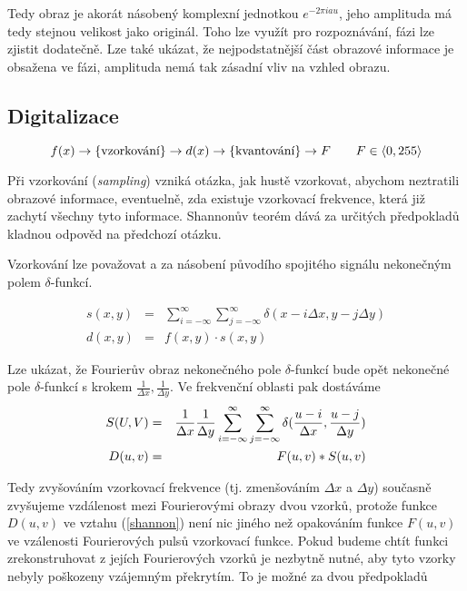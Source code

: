 Tedy obraz je akorát násobený komplexní jednotkou $e^{-2\pi iau}$, jeho amplituda má tedy stejnou velikost jako originál.
Toho lze využít pro rozpoznávání, fázi lze zjistit dodatečně. Lze také ukázat, že nejpodstatnější část obrazové informace
je obsažena ve fázi, amplituda nemá tak zásadní vliv na vzhled obrazu.

\subsection{Digitalizace}

\begin{equation}
f(x)\rightarrow \{\hbox{vzorkování}\}\rightarrow d(x) \rightarrow \{\hbox{kvantování}\} \rightarrow F\qquad F\in\langle0,255\rangle
\end{equation}

Při vzorkování ({\em sampling}) vzniká otázka, jak hustě vzorkovat, abychom neztratili obrazové informace, 
eventuelně, zda existuje vzorkovací frekvence, která již zachytí všechny tyto informace. Shannonův teorém dává za určitých
předpokladů kladnou odpověd na předchozí otázku. 

Vzorkování lze považovat a za násobení původího spojitého signálu nekonečným polem $\delta$-funkcí.

\begin{eqnarray}
s(x,y)&=&\sum\limits_{i=-\infty}^\infty\sum\limits_{j=-\infty}^\infty\delta(x-i\Delta x,y-j\Delta y)\\
d(x,y)&=&f(x,y)\cdot s(x,y)
\end{eqnarray}

Lze ukázat, že Fourierův obraz nekonečného pole $\delta$-funkcí bude opět nekonečné pole $\delta$-funkcí s krokem
$\frac{1}{\Delta x},\frac{1}{\Delta y}$. Ve frekvenční oblasti pak dostáváme
\begin{eqnarray}
S(U,V)&=&\frac{1}{\Delta x}\frac{1}{\Delta y}\sum\limits_{i=-\infty}^\infty\sum\limits_{j=-\infty}^\infty
\delta(\frac{u-i}{\Delta x},\frac{u-j}{\Delta y})\\
D(u,v)&=&F(u,v)\ast S(u,v)\label{shannon}
\end{eqnarray}

Tedy zvyšováním vzorkovací frekvence (tj. zmenšováním $\Delta x$ a $\Delta y$) současně zvyšujeme vzdálenost mezi
Fourierovými obrazy dvou vzorků, protože funkce $D(u,v)$ ve vztahu (\ref{shannon}) není nic jiného než opakováním
funkce $F(u,v)$ ve vzálenosti Fourierových pulsů vzorkovací funkce. Pokud budeme chtít funkci zrekonstruhovat
z jejích Fourierových vzorků je nezbytně nutné, aby tyto vzorky nebyly poškozeny vzájemným překrytím. To je možné za 
dvou předpokladů

